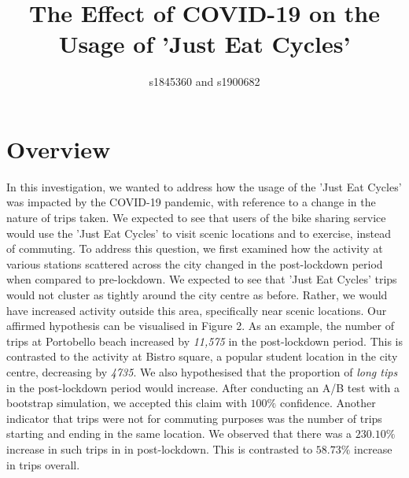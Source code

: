 \documentclass[11pt,a4paper]{article}
\title{%
 The Effect of COVID-19 on the Usage of 'Just Eat Cycles'}
\author{s1845360 and s1900682 \vspace{-6em}}
\date{}
\begin{document}
\maketitle


\section{Overview} In this investigation, we wanted to address how the usage of the 'Just Eat Cycles' was impacted by the COVID-19 pandemic, with reference to a change in the nature of trips taken. We expected to see that users of the bike sharing service would use the 'Just Eat Cycles' to visit scenic locations and to exercise, instead of commuting. To address this question, we first examined how the activity at various stations scattered across the city changed in the post-lockdown period when compared to pre-lockdown. We expected to see that 'Just Eat Cycles' trips would not cluster as tightly around the city centre as before. Rather, we would have increased activity outside this area, specifically near scenic locations. Our affirmed hypothesis can be visualised in Figure 2. As an example, the number of trips at Portobello beach increased by \emph{11,575} in the post-lockdown period. This is contrasted to the activity at Bistro square, a popular student location in the city centre, decreasing by \emph{4735}. We also hypothesised that the proportion of \emph{long tips} in the post-lockdown period would increase. After conducting an A/B test with a bootstrap simulation, we accepted this claim with $100\%$ confidence. Another indicator that trips were not for commuting purposes was the number of trips starting and ending in the same location. We observed that there was a $230.10\%$ increase in such trips in in post-lockdown. This is contrasted to $58.73\%$ increase in trips overall.
\end{document}
